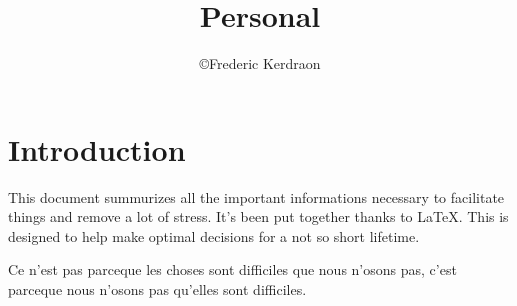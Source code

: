 \documentclass[8pt]{article} %
\title{Personal}
\author{\copyright Frederic Kerdraon}
\begin{document}
\maketitle

\tableofcontents



\section{Introduction}



This document summurizes all the important informations necessary to facilitate things and remove a lot of stress. It's been put together thanks to \LaTeX. This is designed to help make optimal decisions for a not so short lifetime.



{\footnotesize

Ce n'est pas parceque les choses sont difficiles que nous n'osons pas, c'est parceque nous n'osons pas qu'elles sont difficiles.

}






%
%
%
%
%
%
%
%
%
%
%
%
%

\end{document}
